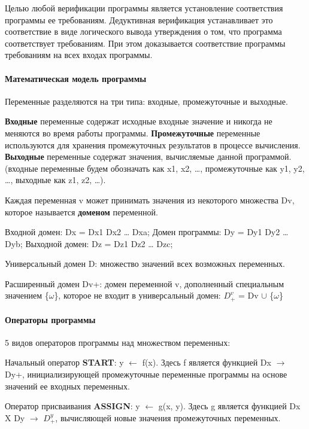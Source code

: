 
Целью любой верификации программы является установление соответствия программы ее требованиям. Дедуктивная верификация устанавливает это соответствие в виде логического вывода утверждения о том, что программа соответствует требованиям. При этом доказывается соответствие программы требованиям на всех входах программы.
\paragraph{Математическая модель программы}

Переменные разделяются на три типа: входные, промежуточные и выходные.

\textbf{Входные} переменные содержат исходные входные значение и никогда не меняются во время работы программы. \textbf{Промежуточные} переменные используются для хранения промежуточных результатов в процессе вычисления. \textbf{Выходные} переменные содержат значения, вычисляемые данной программой.(входные переменные будем обозначать как x1, x2, …, промежуточные как y1, y2, …, выходные как z1, z2, …).

Каждая переменная v может принимать значения из некоторого множества Dv, которое называется \textbf{доменом} переменной.

Входной домен: Dx = Dx1  Dx2  …  Dxa; Домен программы: Dy = Dy1  Dy2  …  Dyb; Выходной домен: Dz = Dz1  Dz2  …  Dzc; 

Универсальный домен D: множество значений всех возможных переменных.

Расширенный домен Dv+: домен переменной v, дополненный специальным значением \{$\omega$\}, которое не входит в универсальный домен: $D^v_+$ = Dv $\cup$ \{$\omega$\}

\paragraph{Операторы программы}
5 видов операторов программы над множеством переменных:

Начальный оператор \textbf{START}: y $\leftarrow$  f(x). Здесь f является функцией Dx $\rightarrow$ Dy+, инициализирующей промежуточные переменные программы на основе значений ее входных переменных.

Оператор присваивания \textbf{ASSIGN}: y $\leftarrow$ g(x, y). Здесь g является функцией                 Dx X Dy $\rightarrow$ $D^y_+$, вычисляющей новые значения промежуточных переменных.

